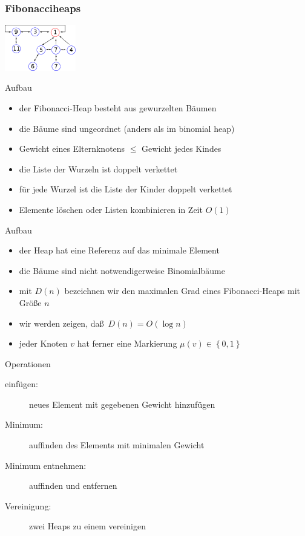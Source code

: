 \documentclass[aspectratio=1610, 11pt]{beamer}
\newcommand\cbc[1]{\left\{{#1}\right\}}
\newcommand{\mytitle}{Fibonacciheaps}
\begin{document}
\begin{frame}\frametitle{\mytitle}
	\hfill\includegraphics[height=20mm]{images/fibo1.pdf}
	\begin{overprint}
\begin{exampleblock}{Aufbau}
		\begin{itemize}
			\item der Fibonacci-Heap besteht aus gewurzelten B\"aumen
			\item die B\"aume sind \alert{ungeordnet} (anders als im binomial heap)
			\item Gewicht eines Elternknotens $\leq$ Gewicht jedes Kindes
			\item die Liste der Wurzeln ist doppelt verkettet
			\item f\"ur jede Wurzel ist die Liste der Kinder doppelt verkettet
			\item Elemente l\"oschen oder Listen kombinieren in Zeit $O(1)$
		\end{itemize}
	\end{exampleblock}	
\begin{exampleblock}{Aufbau}
		\begin{itemize}
			\item der Heap hat eine Referenz auf das minimale Element
			\item die B\"aume sind nicht notwendigerweise Binomialb\"aume
			\item mit $D(n)$ bezeichnen wir den maximalen Grad eines Fibonacci-Heaps mit Gr\"o\ss e $n$
			\item wir werden zeigen, da\ss\ $D(n)=O(\log n)$
			\item jeder Knoten $v$ hat ferner eine \alert{Markierung} $\mu(v)\in\cbc{0,1}$
		\end{itemize}
	\end{exampleblock}
\begin{exampleblock}{Operationen}
		\begin{description}
			\item[einf\"ugen:] neues Element mit gegebenen Gewicht hinzuf\"ugen
			\item[Minimum:] auffinden des Elements mit minimalen Gewicht
			\item[Minimum entnehmen:] auffinden und entfernen
			\item[Vereinigung:] zwei Heaps zu einem vereinigen

\end{description}
\end{exampleblock}
\end{overprint}
\end{frame}
\end{document}

